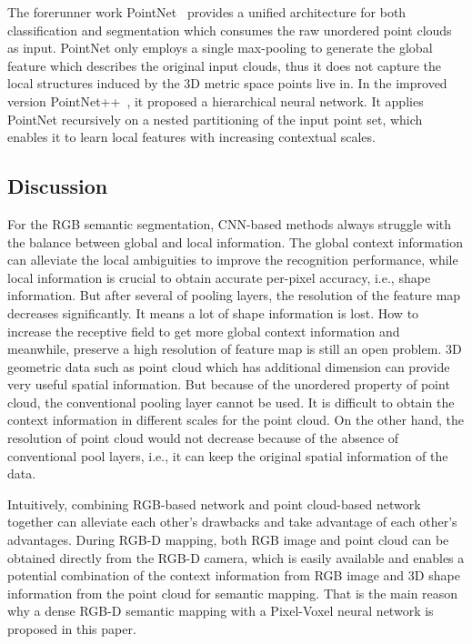 \documentclass[letterpaper, 10 pt, conference]{ieeeconf}
\begin{document}
The forerunner work PointNet~\cite{qi2016pointnet} provides a unified architecture for both classification and segmentation which consumes the raw unordered point clouds as input. PointNet only employs a single max-pooling to generate the global feature which describes the original input clouds, thus it does not capture the local structures induced by the 3D metric space points live in. In the improved version PointNet++~\cite{qi2017pointnet++}, it proposed a hierarchical neural network. It applies PointNet recursively on a nested partitioning of the input point set, which enables it to learn local features with increasing contextual scales. 

\subsection{Discussion}\label{sec:2.3}
For the RGB semantic segmentation, CNN-based methods always struggle with the balance between global and local information. The global context information can alleviate the local ambiguities to improve the recognition performance, while local information is crucial to obtain accurate per-pixel accuracy, i.e., shape information. But after several of pooling layers, the resolution of the feature map decreases significantly. It means a lot of shape information is lost. How to increase the receptive field to get more global context information and meanwhile, preserve a high resolution of feature map is still an open problem. 3D geometric data such as point cloud which has additional dimension can provide very useful spatial information. But because of the unordered property of point cloud, the conventional pooling layer cannot be used. It is difficult to obtain the context information in different scales for the point cloud. On the other hand, the resolution of point cloud would not decrease because of the absence of conventional pool layers, i.e., it can keep the original spatial information of the data. 

Intuitively, combining RGB-based network and point cloud-based network together can alleviate each other's drawbacks and take advantage of each other's advantages. During RGB-D mapping, both RGB image and point cloud can be obtained directly from the RGB-D camera, which is easily available and enables a potential combination of the context information from RGB image and 3D shape information from the point cloud for semantic mapping. That is the main reason why a dense RGB-D semantic mapping with a Pixel-Voxel neural network is proposed in this paper.
\end{document}
